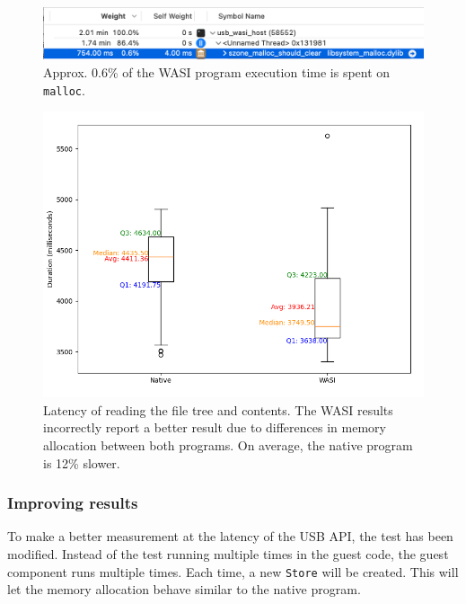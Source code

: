 \begin{figure}[H]
  \centering
  \includegraphics[width=1\textwidth]{images/malloc_wasi_screenshot.png}
  \caption{Approx. 0.6\% of the \acrshort{WASI} program execution time is spent on \texttt{malloc}.}
  \label{fig:malloc_wasi_instruments}
\end{figure}

\begin{figure}[H]
  \centering
  \includegraphics[width=1\textwidth]{images/mass_storage_1000_runs_naive.png}
  \caption{Latency of reading the file tree and contents. The \acrshort{WASI} results incorrectly report a better result due to differences in memory allocation between both programs. On average, the native program is 12\% slower.}
  \label{fig:mass_storage_latency_naive}
\end{figure}



\subsubsection{Improving results}

To make a better measurement at the latency of the \acrshort{USB} \acrshort{API}, the test has been modified. Instead of the test running multiple times in the guest code, the guest component runs multiple times. Each time, a new \texttt{Store} will be created. This will let the memory allocation behave similar to the native program.

